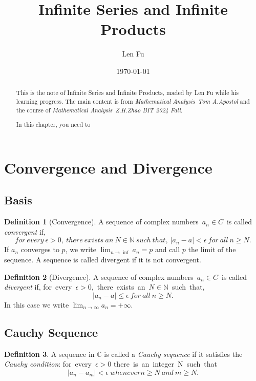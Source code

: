 \documentclass{article}
\title{Infinite Series and Infinite Products}
\author{Len Fu}
\date{\today}
\theoremstyle{definition}
\newtheorem{defi}{Definition}[section]
\begin{document}
\maketitle

\begin{abstract}
This is the note of Infinite Series and Infinite Products,
 maded by Len Fu while his learning progress.
 The main content is from \textit{Mathematical Analysis\ Tom A.Apostol} and the course of \textit{Mathematical Analysis\ Z.H.Zhao BIT 2024 Fall}.

In this chapter,  you need to 
\end{abstract}
\newpage

\renewcommand{\contentsname}{Contents}
\tableofcontents
\newpage



\section{Convergence and Divergence}
\subsection{Basis}

\begin{defi}[Convergence]
A sequence of complex numbers\ $a_{n}\in C$\ is called \textit{convergent} if,
$$for\ every\ \epsilon>0,\ there\ exists\ an\ N\in\mathbb{N}\ such\ that,\
|a_{n}-a|<\epsilon\ for\ all\ n\geq N.$$
If ${a_{n}}$ converges to $p$, we write $\lim_{n\rightarrow\inf}a_{n}=p$ and call
$p$ the limit of the sequence. A sequence is called divergent if it is not convergent.
\end{defi}


\begin{defi}[Divergence]
A sequence of complex numbers\ $a_{n}\in C$\ is called \textit{divergent} if,
for\ every\ $\epsilon>0$,\ there\ exists\ an\ $N\in\mathbb{N}$\ such\ that,
$$|a_{n}-a|\leq\epsilon\ for\ all\ n\geq N.$$
In this case we write $\lim_{n\rightarrow\infty}a_{n}=+\infty$.
\end{defi}

\subsection{Cauchy Sequence}

\begin{defi}
A sequence in $\mathbb{C}$ is called a \textit{Cauchy sequence} if it satisfies the 
\textit{Cauchy condition}:
for\ every\ $\epsilon>0$ there\ is\ an\ integer\ N\ such\ that\
$$|a_{n}-a_{m}|<\epsilon\ whenever n\geq N\ and\ m\geq N.$$
\end{defi}
\end{document}
